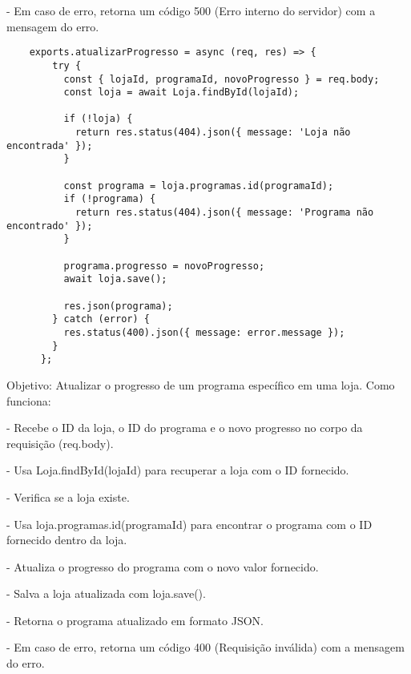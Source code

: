 - Em caso de erro, retorna um código 500 (Erro interno do servidor) com a mensagem do erro.

\vspace{1cm}
\begin{lstlisting}
    exports.atualizarProgresso = async (req, res) => {
        try {
          const { lojaId, programaId, novoProgresso } = req.body;
          const loja = await Loja.findById(lojaId);
          
          if (!loja) {
            return res.status(404).json({ message: 'Loja não encontrada' });
          }
      
          const programa = loja.programas.id(programaId);
          if (!programa) {
            return res.status(404).json({ message: 'Programa não encontrado' });
          }
      
          programa.progresso = novoProgresso;
          await loja.save();
          
          res.json(programa);
        } catch (error) {
          res.status(400).json({ message: error.message });
        }
      };
\end{lstlisting}
\vspace{1cm}

Objetivo: Atualizar o progresso de um programa específico em uma loja.
Como funciona:

- Recebe o ID da loja, o ID do programa e o novo progresso no corpo da requisição (req.body).


- Usa Loja.findById(lojaId) para recuperar a loja com o ID fornecido.

- Verifica se a loja existe.

- Usa loja.programas.id(programaId) para encontrar o programa com o ID fornecido dentro da loja.

- Atualiza o progresso do programa com o novo valor fornecido.

- Salva a loja atualizada com loja.save().

- Retorna o programa atualizado em formato JSON.

- Em caso de erro, retorna um código 400 (Requisição inválida) com a mensagem do erro.

















